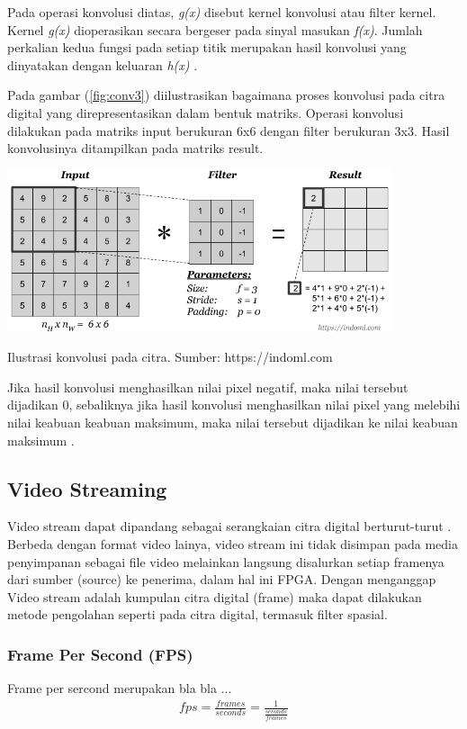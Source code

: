 Pada operasi konvolusi diatas, \textit{g(x)} disebut kernel konvolusi atau filter kernel. Kernel \textit{g(x)} dioperasikan secara bergeser pada sinyal masukan \textit{f(x)}. Jumlah perkalian kedua fungsi pada setiap titik merupakan hasil konvolusi yang dinyatakan dengan keluaran \textit{h(x)} . 

Pada gambar (\ref{fig:conv3}) diilustrasikan bagaimana proses konvolusi pada citra digital yang direpresentasikan dalam bentuk matriks. Operasi konvolusi dilakukan pada matriks input berukuran 6x6 dengan filter berukuran 3x3. Hasil konvolusinya ditampilkan pada matriks result.
\begin{afigure}
    \includegraphics[width=0.85\textwidth, center]{images/convolution-operation.png}
    \caption{Ilustrasi konvolusi pada citra. Sumber: https://indoml.com}
    \label{fig:conv3}
\end{afigure}

Jika hasil konvolusi menghasilkan nilai pixel negatif, maka nilai tersebut dijadikan 0, sebaliknya jika hasil konvolusi menghasilkan nilai pixel yang melebihi nilai keabuan keabuan maksimum, maka nilai tersebut dijadikan ke nilai keabuan maksimum .
 

\subsection{Video Streaming}
Video stream dapat dipandang sebagai serangkaian citra digital berturut-turut . Berbeda dengan format video lainya, video stream ini tidak disimpan pada media penyimpanan sebagai file video melainkan langsung disalurkan setiap framenya dari sumber (source) ke penerima, dalam hal ini FPGA.  Dengan menganggap Video stream adalah kumpulan citra digital (frame) maka dapat dilakukan metode pengolahan seperti pada citra digital, termasuk filter spasial. 


\subsubsection{Frame Per Second (FPS)}
Frame per sercond merupakan bla bla ...
\begin{equation}
    \label{eq:fps}
    \begin{split}
         fps = \frac{frames}{seconds} = \frac{1}{\frac{seconds}{frames}}
    \end{split}
\end{equation}

